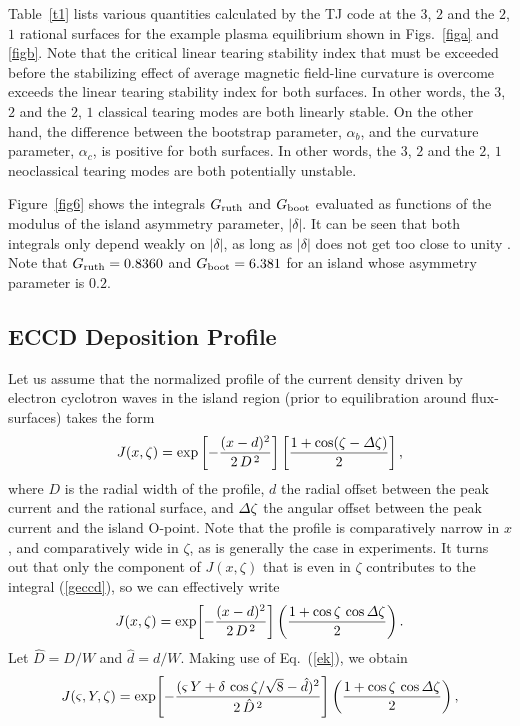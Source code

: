 \documentclass{iopjournal}
\begin{document}
Table~\ref{t1} lists various quantities calculated by the TJ code at the $3$, $2$ and the $2$, $1$ rational surfaces for the example plasma equilibrium shown in Figs.~\ref{figa} and \ref{figb}. 
Note that the critical linear tearing stability index that must be exceeded before the stabilizing effect of average magnetic field-line curvature is overcome \cite{tear10} exceeds the linear tearing stability index for both surfaces. In other words, the $3$, $2$ and the $2$, $1$ classical tearing modes are both linearly stable. On the other hand, the difference between the bootstrap parameter, $\alpha_b$, and the curvature parameter, $\alpha_c$, is positive
for both surfaces. In other words, the $3$, $2$ and the $2$, $1$ neoclassical tearing modes  are both potentially unstable. 

Figure~\ref{fig6} shows the integrals $G_{\rm ruth}$ and $G_{\rm boot}$ evaluated as functions of the modulus of the island asymmetry
parameter, $|\delta|$. It can be seen that both integrals only depend weakly on $|\delta|$, as long as $|\delta|$ does not get too close to
unity \cite{ece6,island}. Note that $G_{\rm ruth} = 0.8360$ and $G_{\rm boot} =6.381$ for an island whose asymmetry parameter is $0.2$. 
 
\subsection{ECCD Deposition Profile}
 Let us assume that the normalized profile of the current density driven by electron cyclotron waves in the island region (prior
 to equilibration around flux-surfaces) takes the form
 \begin{equation}
 J(x,\zeta) = \exp\left[-\frac{(x-d)^2}{2\,D^{\,2}}\right]\left[\frac{1+\cos(\zeta-{\mit\Delta}\zeta)}{2}\right],
 \end{equation}
 where $D$ is the radial width of the profile, $d$  the radial offset between the peak current and the rational surface, and
${\mit\Delta}\zeta$ the angular offset between the peak current and the island O-point. Note that the profile is  comparatively narrow in $x$, and comparatively
wide in $\zeta$, as is  generally the case in experiments. It turns out that  only the component of $J(x,\zeta)$ that is even in $\zeta$ contributes to the integral (\ref{geccd}), so we can effectively write
\begin{equation}
J(x,\zeta)= \exp\!\left[-\frac{(x-d)^2}{2\,D^{\,2}}\right]\left(\frac{1+\cos\zeta\,\cos{\mit\Delta}\zeta}{2}\right).
\end{equation}
Let $\hat{D}=D/W$ and $\hat{d}=d/W$. Making use of Eq.~(\ref{ek}), we obtain 
\begin{equation}
J(\varsigma,Y,\zeta) =  \exp\!\left[-\frac{(\varsigma\,Y+\delta\,\cos\zeta/\sqrt{8}-\hat{d})^2}{2\,\hat{D}^{\,2}}\right]\left(\frac{1+\cos\zeta\,\cos{\mit\Delta}\zeta}{2}\right),
\end{equation}
\end{document}
